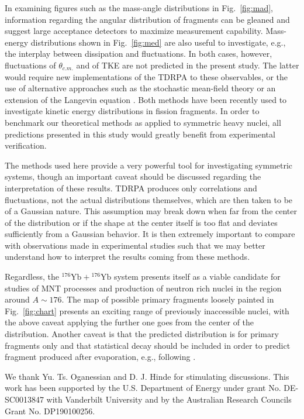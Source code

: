 \documentclass[reprint,aps,prc,twocolumn,superscriptaddress,floatfix,10pt]{revtex4-2}
\begin{document}
In examining figures such as the mass-angle distributions in Fig.~\ref{fig:mad}, information regarding the angular distribution of fragments can be gleaned and suggest large acceptance detectors to maximize measurement capability.
Mass-energy distributions shown in Fig.~\ref{fig:med} are also useful to investigate, e.g., the interplay between dissipation and fluctuations. 
In both cases, however, fluctuations of $\theta_{c.m.}$ and of TKE are not predicted in the present study.
The latter would require new implementations of the TDRPA to these observables, or the use of alternative approaches such as the stochastic mean-field theory \cite{tanimura2017} or an extension of the Langevin equation \cite{bulgac2019}. 
Both methods have been recently used to investigate kinetic energy distributions in fission fragments. 
In order to benchmark our theoretical methods as applied to symmetric heavy nuclei, all predictions presented in this study would greatly benefit from experimental verification.

The methods used here provide a very powerful tool for investigating symmetric systems, though an important caveat should be discussed regarding the interpretation of these results.
TDRPA produces only correlations and fluctuations, not the actual distributions themselves, which are then taken to be of a Gaussian nature.
This assumption may break down when far from the center of the distribution or if the shape at the center itself is too flat and deviates sufficiently from a Gaussian behavior.
It is then extremely important to compare with observations made in experimental studies such that we may better understand how to interpret the results coming from these methods.

Regardless, the $^{176}\mathrm{Yb}+{}^{176}\mathrm{Yb}$ system presents itself as a viable candidate for studies of MNT processes and production of neutron rich nuclei in the region around $A\sim176$.
The map of possible primary fragments loosely painted in Fig.~\ref{fig:chart} presents an exciting range of previously inaccessible nuclei, with the above caveat applying the further one goes from the center of the distribution.
Another caveat is that the predicted distribution is for primary fragments only and that statistical decay should be included in order to predict fragment produced after evaporation, e.g., following \cite{sekizawa2017,umar2017,wu2019}.


\begin{acknowledgments}
We thank Yu. Ts. Oganessian and D. J. Hinde for stimulating discussions.
This work has been supported by the U.S. Department of Energy under grant No.
DE-SC0013847 with Vanderbilt University and by the
Australian Research Councils Grant No. DP190100256.
\end{acknowledgments}




\end{document}
